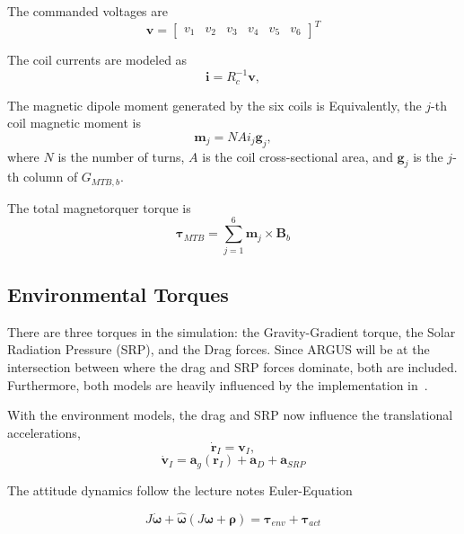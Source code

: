 \documentclass[conference,onecolumn,draftclsnofoot]{IEEEtran}
\begin{document}
The commanded voltages are
\begin{equation}
\mathbf v =
\begin{bmatrix}
v_1&v_2&v_3&v_4&v_5&v_6
\end{bmatrix}^T
\end{equation}

The coil currents are modeled as
\begin{equation}
\mathbf i
=
R_c^{-1}\mathbf v,
\end{equation}

The magnetic dipole moment generated by the six coils is
Equivalently, the \(j\)-th coil magnetic moment is
\begin{equation}
\mathbf m_j
=
N A i_j \mathbf g_j,
\end{equation}
where \(N\) is the number of turns, \(A\) is the coil cross-sectional area, and \(\mathbf g_j\) is the \(j\)-th column of \(G_{MTB,b}\).

The total magnetorquer torque is
\begin{equation}
\boldsymbol{\tau}_{MTB}
=
\sum_{j=1}^{6}
\mathbf m_j \times \mathbf B_b
\end{equation}

\subsection{Environmental Torques}

There are three torques in the simulation: the Gravity-Gradient torque, the Solar Radiation Pressure (SRP), and the Drag forces. Since ARGUS will be at the intersection between where the drag and SRP forces dominate, both are included. Furthermore, both models are heavily influenced by the implementation in~\cite{cmuArgusGncSimulation}.

With the environment models, the drag and SRP now influence the translational accelerations,
\begin{equation}
\dot{\mathbf r}_I
=
\mathbf v_I,
\end{equation}
\begin{equation}
\dot{\mathbf v}_I
=
\mathbf a_g(\mathbf r_I)
+
\mathbf a_D
+
\mathbf a_{SRP}
\end{equation}

The attitude dynamics follow the lecture notes Euler-Equation

\begin{equation}
J\dot{\boldsymbol{\omega}}
+
\hat{\boldsymbol{\omega}}
\left(
J\boldsymbol{\omega}
+
\boldsymbol{\rho}
\right)
=
\boldsymbol{\tau}_{env}
+
\boldsymbol{\tau}_{act}
\end{equation}
\end{document}
